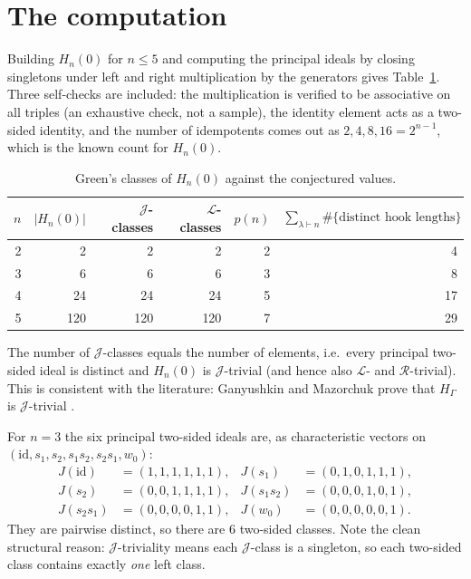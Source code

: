\documentclass[11pt]{article}
\begin{document}
\section{The computation}

Building $H_n(0)$ for $n \le 5$ and computing the principal ideals by closing
singletons under left and right multiplication by the generators gives
Table~\ref{tab:green}.  Three self-checks are included: the multiplication is
verified to be associative on all triples (an exhaustive check, not a sample),
the identity element acts as a two-sided identity, and the number of idempotents
comes out as $2,4,8,16 = 2^{n-1}$, which is the known count for $H_n(0)$.

\begin{table}[htbp]
\centering
\caption{Green's classes of $H_n(0)$ against the conjectured values.}
\label{tab:green}
\begin{tabular}{@{}rrrrrr@{}}
\toprule
$n$ & $\lvert H_n(0)\rvert$ & $\mathcal{J}$-classes & $\mathcal{L}$-classes
    & $p(n)$ & $\displaystyle\sum_{\lambda\vdash n}
               \#\{\text{distinct hook lengths}\}$\\
\midrule
2 &   2 &   2 &   2 & 2 &  4\\
3 &   6 &   6 &   6 & 3 &  8\\
4 &  24 &  24 &  24 & 5 & 17\\
5 & 120 & 120 & 120 & 7 & 29\\
\bottomrule
\end{tabular}
\end{table}

The number of $\mathcal{J}$-classes equals the number of elements, i.e.\ every
principal two-sided ideal is distinct and $H_n(0)$ is $\mathcal{J}$-trivial (and
hence also $\mathcal{L}$- and $\mathcal{R}$-trivial).  This is consistent with
the literature: Ganyushkin and Mazorchuk prove that $H_\Gamma$ is
$\mathcal{J}$-trivial \cite{ganyushkin2010}.

For $n = 3$ the six principal two-sided ideals are, as characteristic vectors on
$(\mathrm{id}, s_1, s_2, s_1s_2, s_2s_1, w_0)$:
\[
\begin{aligned}
J(\mathrm{id})   &= (1,1,1,1,1,1), & J(s_1)   &= (0,1,0,1,1,1),\\
J(s_2)           &= (0,0,1,1,1,1), & J(s_1s_2)&= (0,0,0,1,0,1),\\
J(s_2s_1)        &= (0,0,0,0,1,1), & J(w_0)   &= (0,0,0,0,0,1).
\end{aligned}
\]
They are pairwise distinct, so there are $6$ two-sided classes.  Note the clean
structural reason: $\mathcal{J}$-triviality means each $\mathcal{J}$-class is a
singleton, so each two-sided class contains exactly \emph{one} left class.
\end{document}
